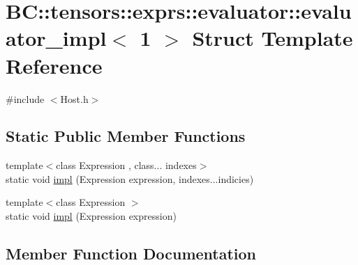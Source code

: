 \hypertarget{structBC_1_1tensors_1_1exprs_1_1evaluator_1_1evaluator__impl_3_011_01_4}{}\section{BC\+:\+:tensors\+:\+:exprs\+:\+:evaluator\+:\+:evaluator\+\_\+impl$<$ 1 $>$ Struct Template Reference}
\label{structBC_1_1tensors_1_1exprs_1_1evaluator_1_1evaluator__impl_3_011_01_4}


{\ttfamily \#include $<$Host.\+h$>$}

\subsection*{Static Public Member Functions}
\begin{DoxyCompactItemize}
\item 
{\footnotesize template$<$class Expression , class... indexes$>$ }\\static void \hyperlink{structBC_1_1tensors_1_1exprs_1_1evaluator_1_1evaluator__impl_3_011_01_4_addfd594899724494abf22fd279a72c1f}{impl} (Expression expression, indexes...\+indicies)
\item 
{\footnotesize template$<$class Expression $>$ }\\static void \hyperlink{structBC_1_1tensors_1_1exprs_1_1evaluator_1_1evaluator__impl_3_011_01_4_a7443170a4abc931eb85ed06e90390268}{impl} (Expression expression)
\end{DoxyCompactItemize}


\subsection{Member Function Documentation}
